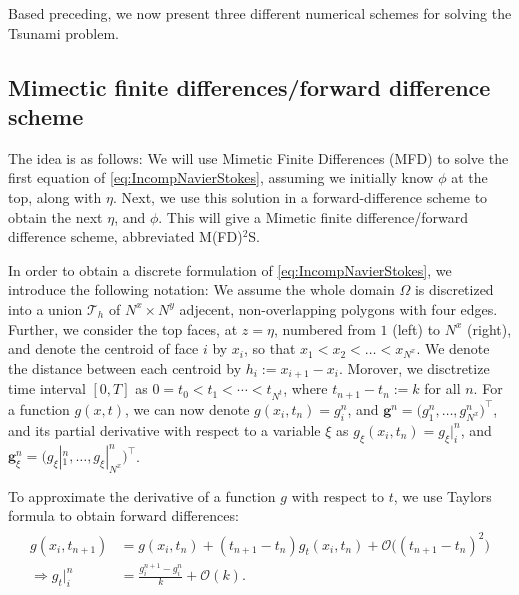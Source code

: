 \documentclass[11pt]{article}
\begin{document}
Based preceding, we now present three different numerical schemes for solving the Tsunami problem.
%
%
\subsection{Mimectic finite differences/forward difference scheme}

The idea is as follows: We will use Mimetic Finite Differences (MFD) \cite{raynaud15} to solve the first equation of \eqref{eq:IncompNavierStokes}, assuming we initially know
$\phi$ at the top, along with $\eta$. Next, we use this solution in a forward-difference scheme to obtain the next $\eta$, and $\phi$. This will give a Mimetic finite
difference/forward difference scheme, abbreviated M(FD)$^2$S.

In order to obtain a discrete formulation of \eqref{eq:IncompNavierStokes}, we introduce the following notation:
We assume the whole domain $\Omega$ is discretized into a union $\mathcal{T}_h$ of $N^x \times N^y$ adjecent, non-overlapping
polygons with four edges. Further, we consider the top faces, at $z = \eta$, numbered from $1$ (left) to $N^x$ (right), and denote
the centroid of face $i$ by $x_i$, so that $x_1 < x_2 < \dots < x_{N^x}$. We denote the distance between each centroid by
$h_i := x_{i+1}-x_i$. Morover, we disctretize time interval $[0, T]$ as $0 = t_0 < t_1 < \cdots < t_{N^t}$, where $t_{n+1}-t_n := k$ for all $n$.
For a function $g(x,t)$, we can now denote $g(x_i, t_n) = g_i^n$, and $\bm{g}^n = \Big(g_1^n, \dots, g_{N^x}^n\Big)^\top$, and its partial derivative with respect
to a variable $\xi$ as $g_\xi(x_i, t_n) = g_{\xi}|_i^n$, and $\bm{g}_\xi^n = \Big(g_{\xi}|_1^n, \dots, g_{\xi}|_{N^x}^n\Big)^\top$.

To approximate the derivative of a function $g$ with respect to $t$, we use Taylors formula to obtain forward differences:
\begin{align}
    \label{eq:ForwardDiff}
    \begin{aligned}
	    g(x_i, t_{n+1})       & = g(x_i, t_n) +  (t_{n+1}-t_n)g_t(x_i, t_n) + \mathcal{O}\big((t_{n+1}-t_n)^2\big) \\
	    \Rightarrow g_t|_i^n & = \frac{g_i^{n+1}-g_i^n}{k} + \mathcal{O}(k).
	\end{aligned}
\end{align}
\end{document}
